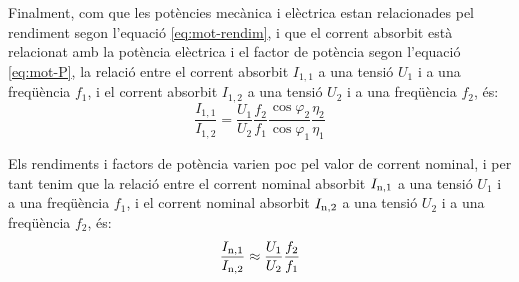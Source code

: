 Finalment, com que les potències mecànica i elèctrica estan relacionades pel rendiment segon l'equació \eqref{eq:mot-rendim}, i que el corrent absorbit està relacionat amb la potència elèctrica i el factor de potència segon l'equació \eqref{eq:mot-P}, la relació entre el corrent absorbit $I_{1,1}$  a una tensió $U_1$ i a una freqüència $f_1$, i el corrent absorbit $I_{1,2}$ a una tensió $U_2$ i a una freqüència $f_2$, és:
\begin{equation}
	\frac{I_{1,1}}{I_{1,2}} =
	\frac{U_1}{U_2} \frac{f_2}{f_1} \frac{\cos\varphi_2}{\cos\varphi_1} \frac{\eta_2}{\eta_1}
\end{equation}

Els rendiments i factors de potència varien poc pel valor de corrent nominal, i per tant tenim que la relació entre el corrent nominal absorbit $I_\mathrm{n,1}$  a una tensió $U_1$ i a una freqüència $f_1$, i el corrent nominal absorbit $I_\mathrm{n,2}$ a una tensió $U_2$ i a una freqüència $f_2$, és:
\begin{equation}\label{eq:In_U_f}
	\frac{I_\mathrm{n,1}}{I_\mathrm{n,2}} \approx
	\frac{U_1}{U_2} \frac{f_2}{f_1}
\end{equation}

